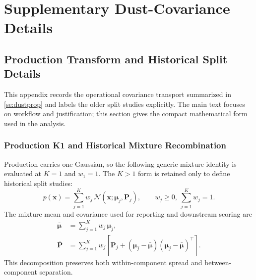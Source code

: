     \chapter{Supplementary Dust-Covariance Details} \label{app:dust_covariance}

    \section{Production Transform and Historical Split Details} \label{ase:covar_split_derivation}
    This appendix records the operational covariance transport summarized in \cref{se:dustprop} and labels the older split studies explicitly. The main text focuses on workflow and justification; this section gives the compact mathematical form used in the analysis.

    \subsection{Production K1 and Historical Mixture Recombination}
    Production carries one Gaussian, so the following generic mixture identity is evaluated at
    \(K=1\) and \(w_1=1\). The \(K>1\) form is retained only to define historical split studies:
    \begin{equation}
        p(\mathbf{x})=\sum_{j=1}^{K} w_j\,\mathcal{N}\!\left(\mathbf{x};\boldsymbol{\mu}_j,\mathbf{P}_j\right),\qquad
        w_j\ge 0,\ \sum_{j=1}^{K}w_j=1.
    \end{equation}
    The mixture mean and covariance used for reporting and downstream scoring are
    \begin{align}
        \bar{\boldsymbol{\mu}} &= \sum_{j=1}^{K} w_j\,\boldsymbol{\mu}_j,\\
        \bar{\mathbf{P}} &= \sum_{j=1}^{K} w_j\!\left[\mathbf{P}_j + \left(\boldsymbol{\mu}_j-\bar{\boldsymbol{\mu}}\right)\left(\boldsymbol{\mu}_j-\bar{\boldsymbol{\mu}}\right)^\top\right].
    \end{align}
    This decomposition preserves both within-component spread and between-component separation.

